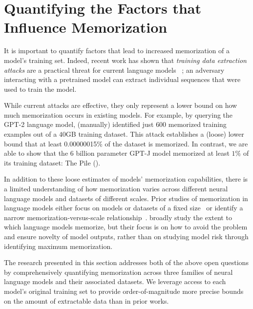 \section{Quantifying the Factors that Influence Memorization}
\label{section:quantifying_memorization}


It is important to  quantify factors that lead to increased memorization of a model's training set.
%
Indeed, recent work has shown that \emph{training data extraction attacks} are a practical threat for current language models ~\citep{carlini2020extracting};
an adversary interacting with a pretrained model can extract individual
sequences that were used to train the model.

While current attacks are effective, they only represent a lower bound on how much memorization occurs in existing models.
%
For example, by querying
the GPT-2 language model, \citet{carlini2020extracting} (manually) identified just $600$ memorized training examples out of a $40$GB training dataset.
%
This attack establishes a (loose) lower bound that at least
0.00000015\%
of the dataset is memorized. %
% 
In contrast, we are able to show that the 6 billion parameter 
GPT-J model \citep{gpt-neo,gpt-j} memorized at least $1\%$ of its training dataset: The Pile (\cite{gao2020pile}).

In addition to these loose estimates of models' memorization capabilities, there is a limited understanding of how memorization varies across different neural language models and datasets of different scales.
%
Prior studies of memorization in language models either focus on models or datasets of a fixed size~\citep{carlini2019secret, zhang2021counterfactual, thakkar2020understanding} or identify a narrow memorization-versus-scale relationship~\citep{carlini2020extracting, lee2021deduplicating}.
\citet{mccoy2021raven} broadly study the extent to which language models memorize, but their focus is on how to avoid the problem and ensure novelty of model outputs, rather than on studying model risk through identifying maximum memorization.

The research presented in this section addresses both of the above open questions by 
comprehensively quantifying memorization across three families of neural language models and their associated datasets.
%
We leverage access to each model's original training set to provide order-of-magnitude more precise bounds on the amount of extractable data than in prior works.

